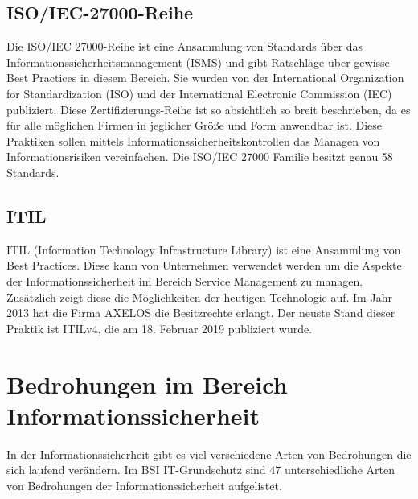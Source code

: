 \subsection{ISO/IEC-27000-Reihe}
Die ISO/IEC 27000-Reihe ist eine Ansammlung von Standards über das Informationssicherheitsmanagement (ISMS) und gibt Ratschläge über gewisse Best Practices in diesem Bereich. Sie wurden von der International Organization for Standardization (ISO) und der International Electronic Commission (IEC) publiziert. 
Diese Zertifizierungs-Reihe ist so absichtlich so breit beschrieben, da es für alle möglichen Firmen in jeglicher Größe und Form anwendbar ist.
Diese Praktiken sollen mittels Informationssicherheitskontrollen das Managen von Informationsrisiken vereinfachen. Die ISO/IEC 27000 Familie besitzt genau 58 Standards.

\subsection{ITIL}
ITIL (Information Technology Infrastructure Library) ist eine Ansammlung von Best Practices. Diese kann von Unternehmen verwendet werden um die Aspekte der Informationssicherheit im Bereich Service Management zu managen. Zusätzlich zeigt diese die Möglichkeiten der heutigen Technologie auf. Im Jahr 2013 hat die Firma AXELOS die Besitzrechte erlangt.
Der neuste Stand dieser Praktik ist ITILv4, die am 18. Februar 2019 publiziert wurde.

\section{Bedrohungen im Bereich Informationssicherheit}
In der Informationssicherheit gibt es viel verschiedene Arten von Bedrohungen die sich laufend verändern. Im BSI IT-Grundschutz sind 47 unterschiedliche Arten von Bedrohungen der Informationssicherheit aufgelistet.

